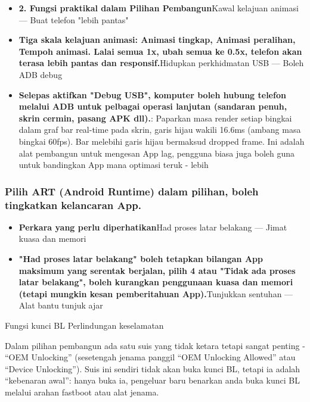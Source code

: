 \begin{itemize}
  \item \textbf{2. Fungsi praktikal dalam Pilihan Pembangun}Kawal kelajuan animasi — Buat telefon "lebih pantas"
  \item \textbf{Tiga skala kelajuan animasi: Animasi tingkap, Animasi peralihan, Tempoh animasi. Lalai semua 1x, ubah semua ke 0.5x, telefon akan terasa lebih pantas dan responsif.}Hidupkan perkhidmatan USB — Boleh ADB debug
  \item \textbf{Selepas aktifkan "Debug USB", komputer boleh hubung telefon melalui ADB untuk pelbagai operasi lanjutan (sandaran penuh, skrin cermin, pasang APK dll).}: Paparkan masa render setiap bingkai dalam graf bar real-time pada skrin, garis hijau wakili 16.6ms (ambang masa bingkai 60fps). Bar melebihi garis hijau bermaksud dropped frame. Ini adalah alat pembangun untuk mengesan App lag, pengguna biasa juga boleh guna untuk bandingkan App mana optimasi teruk - lebih
\end{itemize}

\subsubsection*{Pilih ART (Android Runtime) dalam pilihan, boleh tingkatkan kelancaran App.}

\begin{itemize}
  \item \textbf{Perkara yang perlu diperhatikan}Had proses latar belakang — Jimat kuasa dan memori
  \item \textbf{"Had proses latar belakang" boleh tetapkan bilangan App maksimum yang serentak berjalan, pilih 4 atau "Tidak ada proses latar belakang", boleh kurangkan penggunaan kuasa dan memori (tetapi mungkin kesan pemberitahuan App).}Tunjukkan sentuhan — Alat bantu tunjuk ajar
\end{itemize}

\begin{tcbwarn}{Fungsi kunci BL}
Perlindungan keselamatan

\end{tcbwarn}


Dalam pilihan pembangun ada satu suis yang tidak ketara tetapi sangat penting - “OEM Unlocking” (sesetengah jenama panggil “OEM Unlocking Allowed” atau “Device Unlocking”). Suis ini sendiri tidak akan buka kunci BL, tetapi ia adalah “kebenaran awal”: hanya buka ia, pengeluar baru benarkan anda buka kunci BL melalui arahan fastboot atau alat jenama.

